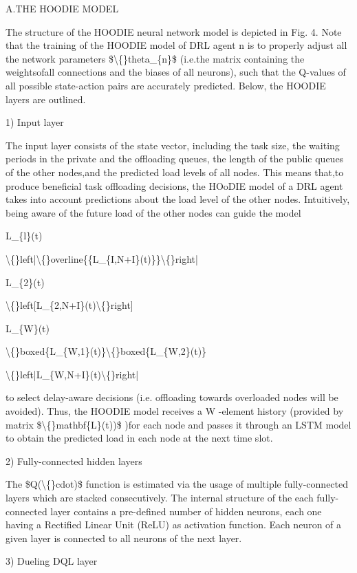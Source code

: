 \documentclass{article}
\begin{document}
A.THE HOODIE MODEL

The structure of the HOODIE neural network model is depicted in Fig. 4. Note that the training of the HOODIE model of DRL agent n is to properly adjust all the network parameters \$\textbackslash\{\}theta\_\{n\}\$ (i.e.the matrix containing the weightsofall connections and the biases of all neurons), such that the Q-values of all possible state-action pairs are accurately predicted. Below, the HOODIE layers are outlined.

1) Input layer

The input layer consists of the state vector, including the task size, the waiting periods in the private and the offloading queues, the length of the public queues of the other nodes,and the predicted load levels of all nodes. This means that,to produce beneficial task offloading decisions, the HOoDIE model of a DRL agent takes into account predictions about the load level of the other nodes. Intuitively, being aware of the future load of the other nodes can guide the model

L\_\{l\}(t)

\textbackslash\{\}left|\textbackslash\{\}overline\{\{L\_\{I,N+I\}(t)\}\}\textbackslash\{\}right|

L\_\{2\}(t)

\textbackslash\{\}left[L\_\{2,N+I\}(t)\textbackslash\{\}right]

L\_\{W\}(t)

\textbackslash\{\}boxed\{L\_\{W,1\}(t)\}\textbackslash\{\}boxed\{L\_\{W,2\}(t)\}

\textbackslash\{\}left|L\_\{W,N+I\}(t)\textbackslash\{\}right|

to select delay-aware decisions (i.e. offloading towards overloaded nodes will be avoided). Thus, the HOODIE model receives a W -element history (provided by matrix \$\textbackslash\{\}mathbf\{L\}(t))\$ )for each node and passes it through an LSTM model to obtain the predicted load in each node at the next time slot.

2) Fully-connected hidden layers

The \$Q(\textbackslash\{\}cdot)\$ function is estimated via the usage of multiple fully-connected layers which are stacked consecutively. The internal structure of the each fully-connected layer contains a pre-defined number of hidden neurons, each one having a Rectified Linear Unit (ReLU) as activation function. Each neuron of a given layer is connected to all neurons of the next layer.

3) Dueling DQL layer
\end{document}
